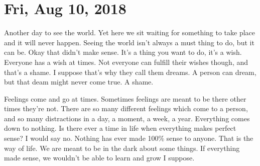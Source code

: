 \section{Fri, Aug 10, 2018}

Another day to see the world. Yet here we sit waiting for something to take place and
it will never happen. Seeing the world isn't always a must thing to do, but it can
be. Okay that didn't make sense. It's a thing you want to do, it's a wish. Everyone
has a wish at times. Not everyone can fulfill their wishes though, and that's a
shame. I suppose that's why they call them dreams. A person can dream, but that deam
might never come true. A shame.

Feelings come and go at times. Sometimes feelings are meant to be there other times
they're not. There are so many different feelings which come to a person, and so many
distractions in a day, a moment, a week, a year. Everything comes down to nothing. Is
there ever a time in life when everything makes perfect sense? I would say no.
Nothing has ever made 100\% sense to anyone. That is the way of life. We are meant to
be in the dark about some things. If everything made sense, we wouldn't be able to
learn and grow I suppose.